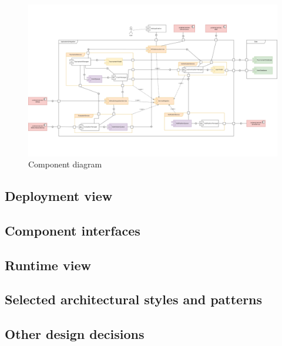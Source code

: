 \begin{figure}[H]
    \centering
    \vspace{-3cm}
    \includegraphics[width=1.6\textwidth,angle=90,origin=c]{Diagrams/component_diagram.png}
    \caption{Component diagram}
\end{figure}


\subsection{Deployment view}
\subsection{Component interfaces}
\subsection{Runtime view}
\subsection{Selected architectural styles and patterns}
\subsection{Other design decisions}